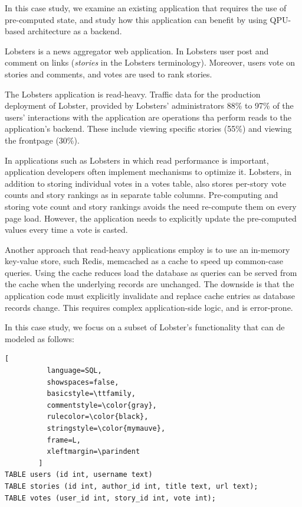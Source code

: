 In this case study, we examine an existing application that requires the use of pre-computed state,
and study how this application can benefit by using QPU-based architecture as a backend.

Lobsters \cite{lobste:rs} is a news aggregator web application.
In Lobsters user post and comment on links (\textit{stories} in the Lobsters terminology).
Moreover, users vote on stories and comments, and votes are used to rank stories.

The Lobsters application is read-heavy.
Traffic data for the production deployment of Lobster, provided by Lobsters' administrators \cite{lobste:stats} 88\% to 97\%
of the users' interactions with the application are operations tha perform reads to the application's backend.
These include viewing specific stories (55\%) and viewing the frontpage (30\%).

In applications such as Lobsters in which read performance is important, application developers often implement mechanisms to optimize it.
Lobsters, in addition to storing individual votes in a votes table, also stores per-story vote counts and story rankings as in separate table columns. \cite{lobsters:schema}
Pre-computing and storing vote count and story rankings avoids the need re-compute them on every page load.
However, the application needs to explicitly update the pre-computed values every time a vote is casted.

Another approach that read-heavy applications employ is to use an in-memory key-value store, such Redis, memcached \cite{nishtala:memcachefacebook}
as a cache to speed up common-case queries.
Using the cache reduces load the database as queries can be served from the cache when the underlying records are unchanged.
The downside is that the application code must explicitly invalidate and replace cache entries as database records change.
This requires complex application-side logic, and is error-prone.

\bigskip
\noindent
In this case study, we focus on a subset of Lobster's functionality that can de modeled as follows:

\begin{lstlisting}[
          language=SQL,
          showspaces=false,
          basicstyle=\ttfamily,
          commentstyle=\color{gray},
          rulecolor=\color{black},
          stringstyle=\color{mymauve},
          frame=L,
          xleftmargin=\parindent
        ]
TABLE users (id int, username text)
TABLE stories (id int, author_id int, title text, url text);
TABLE votes (user_id int, story_id int, vote int);
\end{lstlisting}

